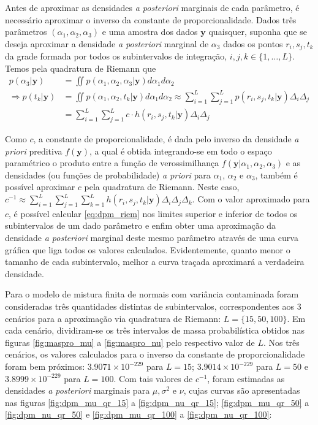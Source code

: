 Antes de aproximar as densidades \textit{a posteriori} marginais de cada parâmetro, é necessário aproximar o inverso da constante de proporcionalidade. Dados três parâmetros $(\alpha_1, \alpha_2, \alpha_3)$ e uma amostra dos dados $\bm{y}$ quaisquer, suponha que se deseja aproximar a densidade \textit{a posteriori} marginal de $\alpha_3$ dados os pontos $r_i, s_j, t_k$ da grade formada por todos os subintervalos de integração, $i, j, k \in \{1, \ldots, L\}$. Temos pela quadratura de Riemann que
\begin{align}
p(\alpha_3 | \bm{y})
&= \iint p(\alpha_1, \alpha_2, \alpha_3 | \bm{y}) d\alpha_1 d\alpha_2 \nonumber \\
\Rightarrow p(t_k | \bm{y})
&= \iint p(\alpha_1, \alpha_2, t_k | \bm{y}) d\alpha_1 d\alpha_2 \approx \sum_{i=1}^{L} \sum_{j=1}^{L} p(r_i, s_j, t_k | \bm{y}) \Delta_i \Delta_j \nonumber \\
&= \sum_{i=1}^{L} \sum_{j=1}^{L} c \cdot h(r_i, s_j, t_k | \bm{y}) \Delta_i \Delta_j \label{eq:dpm_riem}
\end{align}

Como $c$, a constante de proporcionalidade, é dada pelo inverso da densidade \textit{a priori} preditiva $f(\bm{y})$, a qual é obtida integrando-se em todo o espaço paramétrico o produto entre a função de verossimilhança $f(\bm{y} | \alpha_1, \alpha_2, \alpha_3)$ e as densidades (ou funções de probabilidade) \textit{a priori} para $\alpha_1$, $\alpha_2$ e $\alpha_3$, também é possível aproximar $c$ pela quadratura de Riemann. Neste caso, $c^{-1} \approx \sum_{i=1}^{L} \sum_{j=1}^{L} \sum_{k=1}^{L} h(r_i, s_j, t_k | \bm{y}) \Delta_i \Delta_j \Delta_k$. Com o valor aproximado para $c$, é possível calcular \eqref{eq:dpm_riem} nos limites superior e inferior de todos os subintervalos de um dado parâmetro e enfim obter uma aproximação da densidade \emph{a posteriori} marginal deste mesmo parâmetro através de uma curva gráfica que liga todos os valores calculados. Evidentemente, quanto menor o tamanho de cada subintervalo, melhor a curva traçada aproximará a verdadeira densidade.

Para o modelo de mistura finita de normais com variância contaminada foram consideradas três quantidades distintas de subintervalos, correspondentes aos 3 cenários para a aproximação via quadratura de Riemann: $L = \{15, 50, 100\}$. Em cada cenário, dividiram-se os três intervalos de massa probabilística obtidos nas figuras \ref{fig:maspro_mu} a \ref{fig:maspro_nu} pelo respectivo valor de $L$. Nos três cenários, os valores calculados para o inverso da constante de proporcionalidade foram bem próximos: $3.9071 \times 10^{-229}$ para $L = 15$; $3.9014 \times 10^{-229}$ para $L = 50$ e $3.8999 \times 10^{-229}$ para $L = 100$. Com tais valores de $c^{-1}$, foram estimadas as densidades \textit{a posteriori} marginais para $\mu, \sigma^2$ e $\nu$, cujas curvas são apresentadas nas figuras \ref{fig:dpm_mu_qr_15} a \ref{fig:dpm_nu_qr_15}; \ref{fig:dpm_mu_qr_50} a \ref{fig:dpm_nu_qr_50} e \ref{fig:dpm_mu_qr_100} a \ref{fig:dpm_nu_qr_100}:

